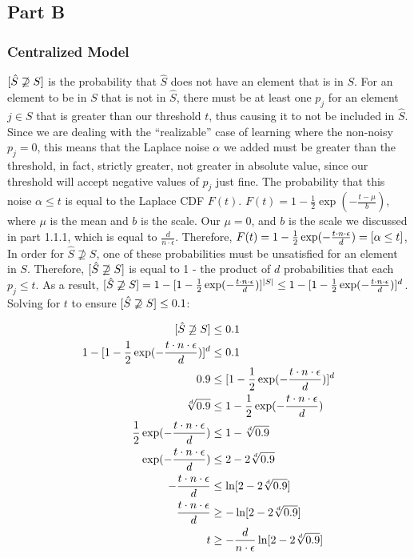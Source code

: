 \documentclass[12pt]{article}
\let\Pr\relax
\DeclareMathOperator*{\Pr}{\mathbb{P}}
\begin{document}
\subsection{Part B}

\subsubsection{Centralized Model}

\noindent

$\Pr[\hat{S} \not \supseteq S]$ is the probability that $\hat{S}$ does not have an element that is in $S$. For an element to be in $S$ that is not in $\hat{S}$, there must be at least one $p_j$ for an element $j \in S$ that is greater than our threshold $t$, thus causing it to not be included in $\hat{S}$. Since we are dealing with the ``realizable'' case of learning where the non-noisy $p_j = 0$, this means that the Laplace noise $\alpha$ we added must be greater than the threshold, in fact, strictly greater, not greater in absolute value, since our threshold will accept negative values of $p_j$ just fine. The probability that this noise $\alpha \leq t$ is equal to the Laplace CDF $F(t)$. $F(t) = 1 - \frac{1}{2} \exp(-\frac{t - \mu}{b})$, where $\mu$ is the mean and $b$ is the scale. Our $\mu = 0$, and $b$ is the scale we discussed in part 1.1.1, which is equal to $\frac{d}{n \cdot \epsilon}$. Therefore, $F(t) = 1 - \frac{1}{2} \exp(-\frac{t \cdot n \cdot \epsilon}{d}) = \Pr[\alpha \leq t]$, In order for $\hat{S} \not \supseteq S$, one of these probabilities must be unsatisfied for an element in $S$. Therefore, $\Pr[\hat{S} \not \supseteq S]$ is equal to 1 - the product of $d$ probabilities that each $p_j \leq t$. As a result, $\Pr[\hat{S} \not \supseteq S] = 1 - [1 - \frac{1}{2} \exp(-\frac{t \cdot n \cdot \epsilon}{d})]^{|S|} \leq 1 - [1 - \frac{1}{2} \exp(-\frac{t \cdot n \cdot \epsilon}{d})]^{d}$. Solving for $t$ to ensure $\Pr[\hat{S} \not \supseteq S] \leq 0.1$:

\begin{align*}
\Pr[\hat{S} \not \supseteq S] &\leq 0.1 \\
1 - [1 - \frac{1}{2} \exp(-\frac{t \cdot n \cdot \epsilon}{d})]^{d} &\leq 0.1 \\
0.9 &\leq [1 - \frac{1}{2} \exp(-\frac{t \cdot n \cdot \epsilon}{d})]^{d} \\
\sqrt[d]{0.9} &\leq 1 - \frac{1}{2} \exp(-\frac{t \cdot n \cdot \epsilon}{d}) \\
\frac{1}{2} \exp(-\frac{t \cdot n \cdot \epsilon}{d}) &\leq 1 - \sqrt[d]{0.9} \\
\exp(-\frac{t \cdot n \cdot \epsilon}{d}) &\leq 2 - 2\sqrt[d]{0.9} \\
-\frac{t \cdot n \cdot \epsilon}{d} &\leq \ln[2 - 2\sqrt[d]{0.9}] \\
\frac{t \cdot n \cdot \epsilon}{d} &\geq -\ln[2 - 2\sqrt[d]{0.9}] \\
t &\geq -\frac{d}{n \cdot \epsilon} \ln[2 - 2\sqrt[d]{0.9}] \\
\end{align*}
\end{document}

